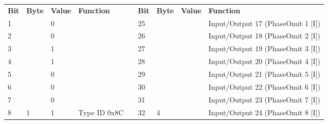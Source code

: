 \documentclass[]{article}
\begin{document}
\begin{landscape}
	\begin{table}[]
		\begin{tabular}{lllllllll}
			\cline{1-4} \cline{6-9}
			\textbf{Bit} & \textbf{Byte}       & \textbf{Value} & \textbf{Function}                            &                    & \textbf{Bit} & \textbf{Byte}       & \textbf{Value} & \textbf{Function}                     \\ \cline{1-4} \cline{6-9} 
			1            &                     & 0              &                                              &                    & 25           &                     &                & Input/Output 17 (PhaseOmit 1 {[}I{]}) \\
			2            &                     & 0              &                                              &                    & 26           &                     &                & Input/Output 18 (PhaseOmit 2 {[}I{]}) \\
			3            &                     & 1              &                                              &                    & 27           &                     &                & Input/Output 19 (PhaseOmit 3 {[}I{]}) \\
			4            &                     & 1              &                                              &                    & 28           &                     &                & Input/Output 20 (PhaseOmit 4 {[}I{]}) \\
			5            &                     & 0              &                                              &                    & 29           &                     &                & Input/Output 21 (PhaseOmit 5 {[}I{]}) \\
			6            &                     & 0              &                                              &                    & 30           &                     &                & Input/Output 22 (PhaseOmit 6 {[}I{]}) \\
			7            &                     & 0              &                                              &                    & 31           &                     &                & Input/Output 23 (PhaseOmit 7 {[}I{]}) \\
			8            & \multirow{-8}{*}{1} & 1              & \multirow{-8}{*}{Type ID 0x8C}               & \multirow{-9}{*}{} & 32           & \multirow{-8}{*}{4} &                & Input/Output 24 (PhaseOmit 8 {[}I{]}) \\ \cline{1-4} \cline{6-9} 

\end{tabular}
\end{table}
\end{landscape}
\end{document}
